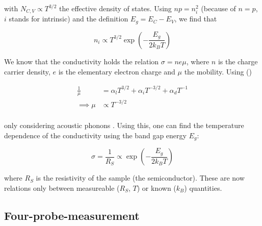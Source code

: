 \documentclass[a4paper]{article}
\begin{document}
with $N_{C,V} \propto T^{3/2}$ the effective density of states. Using $n p = n_i^2$ (because of $n=p$, $i$ stands for intrinsic) and the definition $E_g = E_C - E_V$, we find that 

\begin{equation}
n_i \propto T^{3/2} \exp{\left( -\frac{E_g}{2 k_B T} \right)} \label{eq:ni}
\end{equation}

We know that the conductivity holds the relation $\sigma = n e \mu$, where $n$ is the charge carrier density, $e$ is the elementary electron charge and $\mu$ the mobility. Using (\cite{seitz1952})

\begin{subequations}
\begin{align}
\frac{1}{\mu} &= \alpha_l T^{3/2} + \alpha_i T^{-3/2} + \alpha_d T^{-1} \label{eq:seitz} \\
\implies \mu &\propto T^{-3/2} \label{eq:mu} \\
\end{align}
\end{subequations}

only considering acoustic phonons \cite{esslin2018}. Using this, one can find the temperature dependence of the conductivity using the band gap energy $E_g$:

\begin{equation}
\sigma = \frac{1}{R_S} \propto \exp{\left( - \frac{E_{g}}{2 k_B T} \right)} \label{eq:conductivity}
\end{equation}

where $R_S$ is the resistivity of the sample (the semiconductor). These are now relations only between measureable ($R_S$, $T$) or known ($k_B$) quantities.

\subsection{Four-probe-measurement}
\label{sec:fpm}
\end{document}
